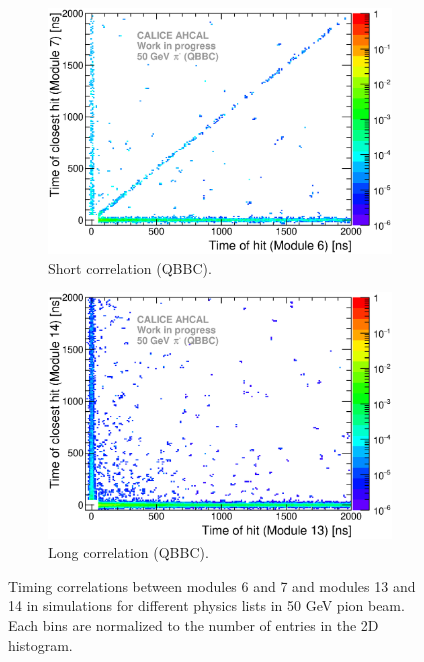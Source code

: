 \begin{figure}[htbp!]
\begin{subfigure}[t]{0.49\textwidth}
    \centering
    \includegraphics[width=1\textwidth]{../Thesis_Plots/Timing/Pions/Plots/ComparisonToSim/Time_Correlation_50GeV_short_QBBC.eps}
    \caption{Short correlation (QBBC).} \label{fig:Corr_short_QBBC}
  \end{subfigure}
  \hfill
  \begin{subfigure}[t]{0.49\textwidth}
    \centering
    \includegraphics[width=1\textwidth]{../Thesis_Plots/Timing/Pions/Plots/ComparisonToSim/Time_Correlation_50GeV_long_QBBC.eps}
    \caption{Long correlation (QBBC).} \label{fig:Corr_long_QBBC}
  \end{subfigure}
  \caption{Timing correlations between modules 6 and 7 and modules 13 and 14 in \mokka simulations for different physics lists in 50 GeV pion beam. Each bins are normalized to the number of entries in the 2D histogram.}
\end{figure}

